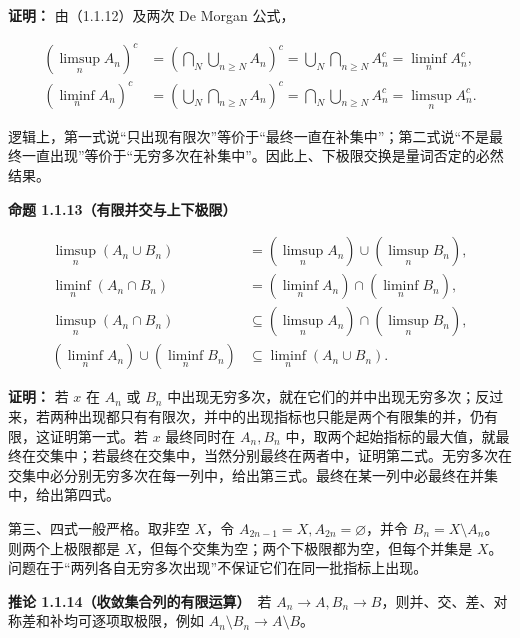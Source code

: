 \documentclass[11pt,a4paper]{article}
\begin{document}
\textbf{证明：} 由（1.1.12）及两次 De Morgan 公式，

\begin{equation*}
\begin{aligned}
(\limsup_n A_n)^c
 &=\left(\bigcap_N\bigcup_{n\ge N}A_n\right)^c
 =\bigcup_N\bigcap_{n\ge N}A_n^c=\liminf_n A_n^c,\\
(\liminf_n A_n)^c
 &=\left(\bigcup_N\bigcap_{n\ge N}A_n\right)^c
 =\bigcap_N\bigcup_{n\ge N}A_n^c=\limsup_n A_n^c.
\end{aligned}\tag{1.1.17}
\end{equation*}

逻辑上，第一式说``只出现有限次''等价于``最终一直在补集中''；第二式说``不是最终一直出现''等价于``无穷多次在补集中''。因此上、下极限交换是量词否定的必然结果。

\textbf{命题 1.1.13（有限并交与上下极限）}

\begin{equation*}
\begin{aligned}
\limsup_n(A_n\cup B_n)&=(\limsup_n A_n)\cup(\limsup_n B_n),\\
\liminf_n(A_n\cap B_n)&=(\liminf_n A_n)\cap(\liminf_n B_n),\\
\limsup_n(A_n\cap B_n)&\subseteq(\limsup_n A_n)\cap(\limsup_n B_n),\\
(\liminf_n A_n)\cup(\liminf_n B_n)&\subseteq\liminf_n(A_n\cup B_n).
\end{aligned}\tag{1.1.18}
\end{equation*}

\textbf{证明：} 若 \(x\) 在 \(A_n\) 或 \(B_n\)
中出现无穷多次，就在它们的并中出现无穷多次；反过来，若两种出现都只有有限次，并中的出现指标也只能是两个有限集的并，仍有限，这证明第一式。若
\(x\) 最终同时在 \(A_n,B_n\)
中，取两个起始指标的最大值，就最终在交集中；若最终在交集中，当然分别最终在两者中，证明第二式。无穷多次在交集中必分别无穷多次在每一列中，给出第三式。最终在某一列中必最终在并集中，给出第四式。

第三、四式一般严格。取非空 \(X\)，令
\(A_{2n-1}=X,A_{2n}=\varnothing\)，并令
\(B_n=X\setminus A_n\)。则两个上极限都是
\(X\)，但每个交集为空；两个下极限都为空，但每个并集是
\(X\)。问题在于``两列各自无穷多次出现''不保证它们在同一批指标上出现。

\textbf{推论 1.1.14（收敛集合列的有限运算）}　若
\(A_n\to A,B_n\to B\)，则并、交、差、对称差和补均可逐项取极限，例如
\(A_n\setminus B_n\to A\setminus B\)。
\end{document}
